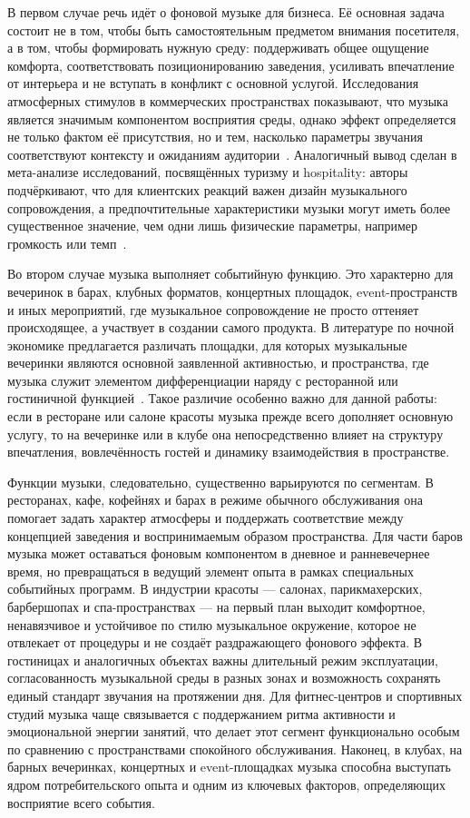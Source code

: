 В первом случае речь идёт о фоновой музыке для бизнеса. Её основная задача состоит не в том, чтобы быть самостоятельным предметом внимания посетителя, а в том, чтобы формировать нужную среду: поддерживать общее ощущение комфорта, соответствовать позиционированию заведения, усиливать впечатление от интерьера и не вступать в конфликт с основной услугой. Исследования атмосферных стимулов в коммерческих пространствах показывают, что музыка является значимым компонентом восприятия среды, однако эффект определяется не только фактом её присутствия, но и тем, насколько параметры звучания соответствуют контексту и ожиданиям аудитории~\cite{roschk2017atmospheric}. Аналогичный вывод сделан в мета-анализе исследований, посвящённых туризму и hospitality: авторы подчёркивают, что для клиентских реакций важен дизайн музыкального сопровождения, а предпочтительные характеристики музыки могут иметь более существенное значение, чем одни лишь физические параметры, например громкость или темп~\cite{trompeta2022music}.

Во втором случае музыка выполняет событийную функцию. Это характерно для вечеринок в барах, клубных форматов, концертных площадок, event-пространств и иных мероприятий, где музыкальное сопровождение не просто оттеняет происходящее, а участвует в создании самого продукта. В литературе по ночной экономике предлагается различать площадки, для которых музыкальные вечеринки являются основной заявленной активностью, и пространства, где музыка служит элементом дифференциации наряду с ресторанной или гостиничной функцией~\cite{ramon2022nightlife}. Такое различие особенно важно для данной работы: если в ресторане или салоне красоты музыка прежде всего дополняет основную услугу, то на вечеринке или в клубе она непосредственно влияет на структуру впечатления, вовлечённость гостей и динамику взаимодействия в пространстве.

Функции музыки, следовательно, существенно варьируются по сегментам. В ресторанах, кафе, кофейнях и барах в режиме обычного обслуживания она помогает задать характер атмосферы и поддержать соответствие между концепцией заведения и воспринимаемым образом пространства. Для части баров музыка может оставаться фоновым компонентом в дневное и ранневечернее время, но превращаться в ведущий элемент опыта в рамках специальных событийных программ. В индустрии красоты — салонах, парикмахерских, барбершопах и спа-пространствах — на первый план выходит комфортное, ненавязчивое и устойчивое по стилю музыкальное окружение, которое не отвлекает от процедуры и не создаёт раздражающего фонового эффекта. В гостиницах и аналогичных объектах важны длительный режим эксплуатации, согласованность музыкальной среды в разных зонах и возможность сохранять единый стандарт звучания на протяжении дня. Для фитнес-центров и спортивных студий музыка чаще связывается с поддержанием ритма активности и эмоциональной энергии занятий, что делает этот сегмент функционально особым по сравнению с пространствами спокойного обслуживания. Наконец, в клубах, на барных вечеринках, концертных и event-площадках музыка способна выступать ядром потребительского опыта и одним из ключевых факторов, определяющих восприятие всего события.

